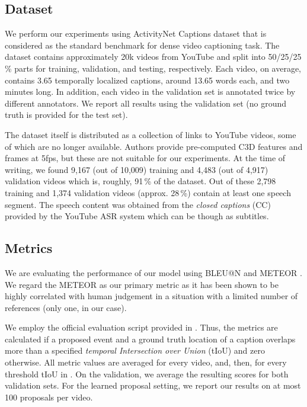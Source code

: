 \documentclass[10pt,twocolumn,letterpaper]{article}
\begin{document}
\subsection{Dataset}
We perform our experiments using ActivityNet Captions dataset \cite{Krishna2017} that is considered as the standard benchmark for dense video captioning task. The dataset contains approximately 20k videos from YouTube and split into 50/25/25\,\% parts for training, validation, and testing, respectively. Each video, on average, contains 3.65 temporally localized captions, around 13.65 words each, and two minutes long. In addition, each video in the validation set is annotated twice by different annotators. We report all results using the validation set (no ground truth is provided for the test set). 

The dataset itself is distributed as a collection of links to YouTube videos, some of which are no longer available. Authors provide pre-computed C3D features and frames at 5fps, but these are not suitable for our experiments. At the time of writing, we found 9,167 (out of 10,009) training and 4,483 (out of 4,917) validation videos which is, roughly, 91\,\% of the dataset. Out of these 2,798 training and 1,374 validation videos (approx. 28\,\%) contain at least one speech segment. The speech content was obtained from the \textit{closed captions} (CC) provided by the YouTube ASR system which can be though as subtitles.

\subsection{Metrics}\label{sec:metrics}

We are evaluating the performance of our model using BLEU@N \cite{Papineni2002} and METEOR \cite{Denkowski2014}. We regard the METEOR as our primary metric as it has been shown to be highly correlated with human judgement in a situation with a limited number of references (only one, in our case). 

We employ the official evaluation script provided in \cite{KrishnaGithub}. Thus, the metrics are calculated if a proposed event and a ground truth location of a caption overlaps more than a specified \textit{temporal Intersection over Union} (tIoU) and zero otherwise. All metric values are averaged for every video, and, then, for every threshold tIoU in . On the validation, we average the resulting scores for both validation sets. For the learned proposal setting, we report our results on at most 100 proposals per video.
\end{document}
